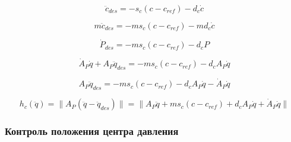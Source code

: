 
\begin{equation*}
  \ddot{c}_{des} = - s_{c} (c - c_{ref}) - d_{c} \dot{c}
\end{equation*}


\begin{equation*}
  m \ddot{c}_{des} = - m s_{c} (c - c_{ref}) - m d_{c} \dot{c}
\end{equation*}


\begin{equation*}
  \dot{P}_{des} = - m s_{c} (c - c_{ref}) - d_{c} P
\end{equation*}


\begin{equation*}
  \dot{A}_{P} \dot{q} + A_{P} \ddot{q}_{des} = - m s_{c} (c - c_{ref}) - d_{c} A_{P} \dot{q}
\end{equation*}


\begin{equation*}
  A_{P} \ddot{q}_{des} = - m s_{c} (c - c_{ref}) - d_{c} A_{P} \dot{q} - \dot{A}_{P} \dot{q}
\end{equation*}


\begin{equation*}
  h_{c}(\ddot{q}) = \lVert A_{P} (\ddot{q} - \ddot{q}_{des} ) \rVert = \lVert A_{P} \ddot{q} + m s_{c} (c - c_{ref}) + d_{c} A_{P} \dot{q} + \dot{A}_{P} \dot{q} \rVert
\end{equation*}






\subsubsection{Контроль положения центра давления}

